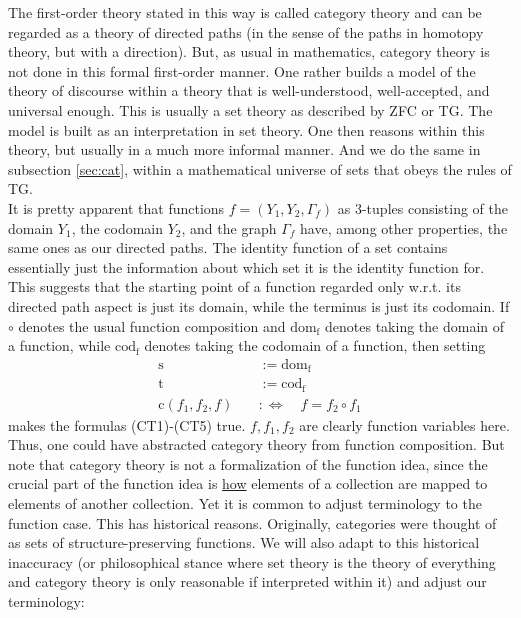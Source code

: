 The first-order theory stated in this way is called category theory and can be regarded as a theory of directed paths (in the sense of the paths in homotopy theory, but with a direction).
But, as usual in mathematics, category theory is not done in this formal first-order manner.
One rather builds a model of the theory of discourse within a theory that is well-understood, well-accepted, and universal enough.
This is usually a set theory as described by ZFC or TG.
The model is built as an interpretation in set theory.
One then reasons within this theory, but usually in a much more informal manner.
And we do the same in subsection \ref{sec:cat}, within a mathematical universe of sets that obeys the rules of TG.
\\
It is pretty apparent that functions $f = (Y_{1},Y_{2},\Gamma_{f})$ as $3$-tuples consisting of the domain $Y_{1}$, the codomain $Y_{2}$, and the graph $\Gamma_{f}$ have, among other properties, the same ones as our directed paths.
The identity function of a set contains essentially just the information about which set it is the identity function for.
This suggests that the starting point of a function regarded only w.r.t.
its directed path aspect is just its domain, while the terminus is just its codomain.
If $\circ$ denotes the usual function composition and $\mathrm{dom}_{\mathrm{f}}$ denotes taking the domain of a function, while $\mathrm{cod}_{\mathrm{f}}$ denotes taking the codomain of a function, then setting
\begin{align*}
  \mathrm{s}
  &:=
  \mathrm{dom}_{\mathrm{f}}
  \\
  \mathrm{t}
  &:=
  \mathrm{cod}_{\mathrm{f}}
  \\
  \mathrm{c}(f_{1},f_{2},f)
  \quad
  &:\Leftrightarrow
  \quad
  f
  =
  f_{2}
  \circ
  f_{1}
\end{align*}
makes the formulas (CT1)-(CT5) true.
$f,f_{1},f_{2}$ are clearly function variables here.
Thus, one could have abstracted category theory from function composition.
But note that category theory is not a formalization of the function idea, since the crucial part of the function idea is \underline{how} elements of a collection are mapped to elements of another collection.
Yet it is common to adjust terminology to the function case.
This has historical reasons.
Originally, categories were thought of as sets of structure-preserving functions.
We will also adapt to this historical inaccuracy (or philosophical stance where set theory is the theory of everything and category theory is only reasonable if interpreted within it) and adjust our terminology:
